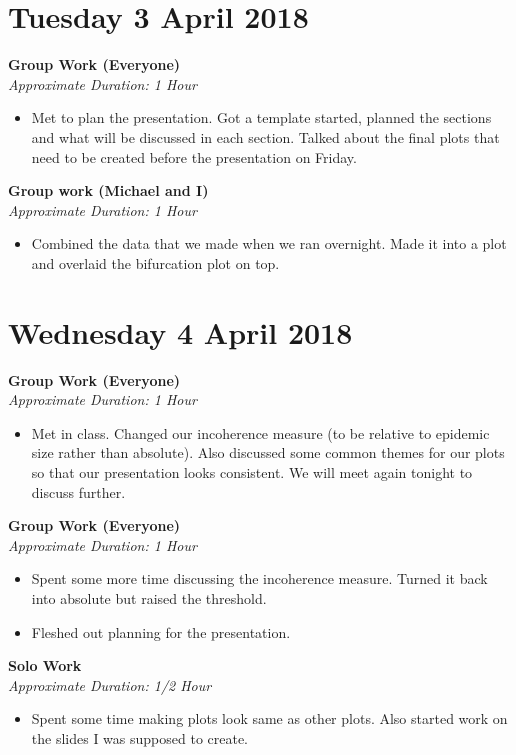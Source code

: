 \documentclass[12pt]{article}\usepackage[]{graphicx}\usepackage[]{color}
\begin{document}
\begin{itemize}
\section*{Tuesday 3 April 2018}
\textbf{Group Work (Everyone)} \\
\emph{Approximate Duration: 1 Hour}

\begin{itemize}
\item Met to plan the presentation. Got a template started, planned the sections and what will be discussed in each section. Talked about the final plots that need to be created before the presentation on Friday.
\end{itemize}

\textbf{Group work (Michael and I)}\\
\emph{Approximate Duration: 1 Hour}

\begin{itemize}
\item Combined the data that we made when we ran overnight. Made it into a plot and overlaid the bifurcation plot on top. 
\end{itemize}


\section*{Wednesday 4 April 2018}
\textbf{Group Work (Everyone)} \\
\emph{Approximate Duration: 1 Hour}

\begin{itemize}
\item Met in class. Changed our incoherence measure (to be relative to epidemic size rather than absolute). Also discussed some common themes for our plots so that our presentation looks consistent. We will meet again tonight to discuss further.
\end{itemize}

\textbf{Group Work (Everyone)}\\
\emph{Approximate Duration: 1 Hour}
\begin{itemize}
\item Spent some more time discussing the incoherence measure. Turned it back into absolute but raised the threshold.
\item Fleshed out planning for the presentation.
\end{itemize}

\textbf{Solo Work}\\
\emph{Approximate Duration: 1/2 Hour}
\begin{itemize}
\item Spent some time making plots look same as other plots. Also started work on the slides I was supposed to create.
\end{itemize}



\end{itemize}
\end{document}
